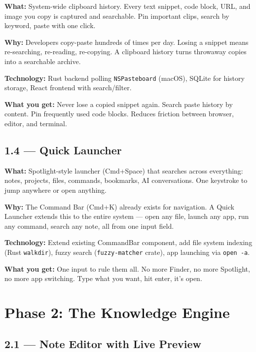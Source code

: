 \documentclass[11pt,a4paper]{article}
\begin{document}
\textbf{What:} System-wide clipboard history. Every text snippet, code block, URL, and image you copy is captured and searchable. Pin important clips, search by keyword, paste with one click.

\textbf{Why:} Developers copy-paste hundreds of times per day. Losing a snippet means re-searching, re-reading, re-copying. A clipboard history turns throwaway copies into a searchable archive.

\textbf{Technology:} Rust backend polling \texttt{NSPasteboard} (macOS), SQLite for history storage, React frontend with search/filter.

\textbf{What you get:} Never lose a copied snippet again. Search paste history by content. Pin frequently used code blocks. Reduces friction between browser, editor, and terminal.

\subsection{1.4 --- Quick Launcher}

\textbf{What:} Spotlight-style launcher (Cmd+Space) that searches across everything: notes, projects, files, commands, bookmarks, AI conversations. One keystroke to jump anywhere or open anything.

\textbf{Why:} The Command Bar (Cmd+K) already exists for navigation. A Quick Launcher extends this to the entire system --- open any file, launch any app, run any command, search any note, all from one input field.

\textbf{Technology:} Extend existing CommandBar component, add file system indexing (Rust \texttt{walkdir}), fuzzy search (\texttt{fuzzy-matcher} crate), app launching via \texttt{open -a}.

\textbf{What you get:} One input to rule them all. No more Finder, no more Spotlight, no more app switching. Type what you want, hit enter, it's open.

\section{Phase 2: The Knowledge Engine}

\subsection{2.1 --- Note Editor with Live Preview}
\end{document}
